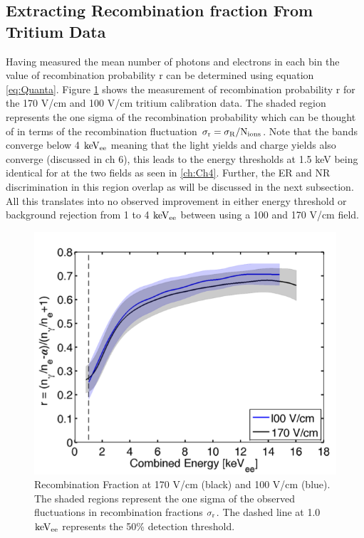 \subsection{Extracting Recombination fraction From Tritium Data}

Having measured the mean number of photons and electrons in each bin the value of recombination probability r can be determined using equation \ref{eq:Quanta}. Figure \ref{fig:R_T} shows the measurement of recombination probability r for the 170 V/cm and 100 V/cm tritium calibration data. The shaded region represents the one sigma of the recombination probability which can be thought of in terms of the recombination fluctuation $\rm \sigma_r = \sigma_R / N_{ions} $. Note that the bands converge below 4 $\rm keV_{ee}$ meaning that the light yields and charge yields also converge (discussed in ch 6), this leads to the energy thresholds at 1.5 keV being identical for at the two fields as seen in \ref{ch:Ch4}. Further, the ER and NR discrimination in this region overlap as will be discussed in the next subsection. All this translates into no observed improvement in either energy threshold or background rejection from 1 to 4 $\rm keV_{ee}$ between using a 100 and 170 V/cm field.

\begin{figure}[h!]\centering
\includegraphics[width=120mm]{Chapter_Flucs/Figures/Iter1_100/R_comp.png}
\caption{Recombination Fraction at 170 V/cm (black) and 100 V/cm (blue). The shaded regions represent the one sigma of the observed fluctuations in recombination fractions $\rm \sigma_r$. The dashed line at 1.0 $\rm keV_{ee}$ represents the 50\% detection threshold.}
\label{fig:R_T}
\end{figure}


